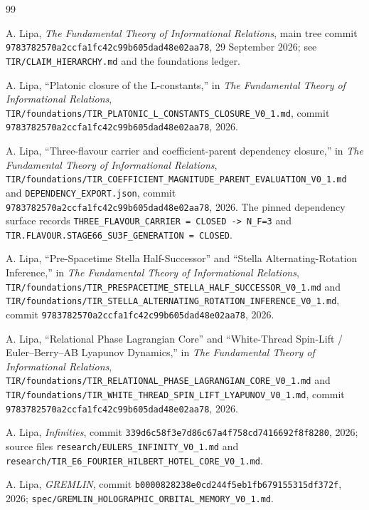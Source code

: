 \documentclass[11pt]{article}
\newcommand{\codeid}[1]{\nolinkurl{#1}}
\begin{document}
\begin{thebibliography}{99}
\small

A. Lipa, \emph{The Fundamental Theory of Informational Relations}, main tree
commit \codeid{9783782570a2ccfa1fc42c99b605dad48e02aa78}, 29 September 2026;
see \codeid{TIR/CLAIM_HIERARCHY.md} and the foundations ledger.

A. Lipa, ``Platonic closure of the L-constants,'' in \emph{The Fundamental
Theory of Informational Relations},
\codeid{TIR/foundations/TIR_PLATONIC_L_CONSTANTS_CLOSURE_V0_1.md}, commit
\codeid{9783782570a2ccfa1fc42c99b605dad48e02aa78}, 2026.

A. Lipa, ``Three-flavour carrier and coefficient-parent dependency closure,''
in \emph{The Fundamental Theory of Informational Relations},
\codeid{TIR/foundations/TIR_COEFFICIENT_MAGNITUDE_PARENT_EVALUATION_V0_1.md}
and \codeid{DEPENDENCY_EXPORT.json}, commit
\codeid{9783782570a2ccfa1fc42c99b605dad48e02aa78}, 2026. The pinned dependency
surface records \codeid{THREE_FLAVOUR_CARRIER = CLOSED -> N_F=3} and
\codeid{TIR.FLAVOUR.STAGE66_SU3F_GENERATION = CLOSED}.

A. Lipa, ``Pre-Spacetime Stella Half-Successor'' and
``Stella Alternating-Rotation Inference,'' in \emph{The Fundamental Theory
of Informational Relations},
\codeid{TIR/foundations/TIR_PRESPACETIME_STELLA_HALF_SUCCESSOR_V0_1.md} and
\codeid{TIR/foundations/TIR_STELLA_ALTERNATING_ROTATION_INFERENCE_V0_1.md},
commit \codeid{9783782570a2ccfa1fc42c99b605dad48e02aa78}, 2026.

A. Lipa, ``Relational Phase Lagrangian Core'' and
``White-Thread Spin-Lift / Euler--Berry--AB Lyapunov Dynamics,'' in
\emph{The Fundamental Theory of Informational Relations},
\codeid{TIR/foundations/TIR_RELATIONAL_PHASE_LAGRANGIAN_CORE_V0_1.md} and
\codeid{TIR/foundations/TIR_WHITE_THREAD_SPIN_LIFT_LYAPUNOV_V0_1.md},
commit \codeid{9783782570a2ccfa1fc42c99b605dad48e02aa78}, 2026.

A. Lipa, \emph{Infinities}, commit
\codeid{339d6c58f3e7d86c67a4f758cd7416692f8f8280}, 2026; source files
\codeid{research/EULERS_INFINITY_V0_1.md} and
\codeid{research/TIR_E6_FOURIER_HILBERT_HOTEL_CORE_V0_1.md}.

A. Lipa, \emph{GREMLIN}, commit
\codeid{b0000828238e0cd244f5eb1fb679155315df372f}, 2026;
\codeid{spec/GREMLIN_HOLOGRAPHIC_ORBITAL_MEMORY_V0_1.md}.


\end{thebibliography}
\end{document}
